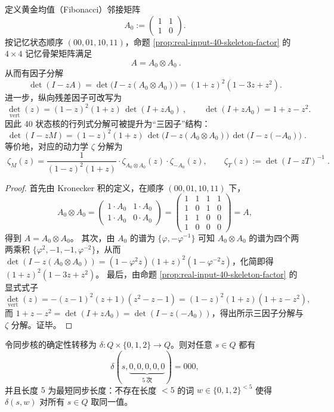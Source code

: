 \begin{proposition}\label{prop:real-input-40-A0-tensor-hidden}
定义黄金均值（Fibonacci）邻接矩阵
\[
A_0:=\begin{pmatrix}1&1\\[2pt]1&0\end{pmatrix}.
\]
按记忆状态顺序 \((00,01,10,11)\)，命题 \ref{prop:real-input-40-skeleton-factor} 的 \(4\times 4\) 记忆骨架矩阵满足
\[
\boxed{\ A=A_0\otimes A_0\ }.
\]
从而有因子分解
\[
\det(I-zA)=\det\!\bigl(I-z(A_0\otimes A_0)\bigr)
=(1+z)^2(1-3z+z^2).
\]
进一步，纵向残差因子可改写为
\[
\boxed{\ \det_{\mathrm{vert}}(z)=(1-z)^2(1+z)\,\det(I+zA_0)\ },
\qquad
\det(I+zA_0)=1+z-z^2.
\]
因此 40 状态核的行列式分解可被提升为“三因子”结构：
\[
\boxed{\;
\det(I-zM)
=(1-z)^2(1+z)\,
\det\!\bigl(I-z(A_0\otimes A_0)\bigr)\,
\det\!\bigl(I-z(-A_0)\bigr)\; }.
\]
等价地，对应的动力学 \(\zeta\) 分解为
\[
\boxed{\;
\zeta_M(z)=\frac{1}{(1-z)^2(1+z)}\cdot
\zeta_{A_0\otimes A_0}(z)\cdot
\zeta_{-A_0}(z),\qquad
\zeta_T(z):=\det(I-zT)^{-1}\; }.
\]
\end{proposition}

\begin{proof}
首先由 Kronecker 积的定义，在顺序 \((00,01,10,11)\) 下，
\[
A_0\otimes A_0=
\begin{pmatrix}
1\cdot A_0 & 1\cdot A_0\\
1\cdot A_0 & 0\cdot A_0
\end{pmatrix}
=
\begin{pmatrix}
1&1&1&1\\
1&0&1&0\\
1&1&0&0\\
1&0&0&0
\end{pmatrix}=A,
\]
得到 \(A=A_0\otimes A_0\)。
其次，由 \(A_0\) 的谱为 \(\{\varphi,-\varphi^{-1}\}\) 可知 \(A_0\otimes A_0\) 的谱为四个两两乘积
\(\{\varphi^2,-1,-1,\varphi^{-2}\}\)，从而
\(\det(I-z(A_0\otimes A_0))=(1-\varphi^2 z)(1+\!z)^2(1-\varphi^{-2}z)\)，化简即得 \((1+z)^2(1-3z+z^2)\)。
最后，由命题 \ref{prop:real-input-40-skeleton-factor} 的显式式子
\[
\det_{\mathrm{vert}}(z)=-(z-1)^2(z+1)(z^2-z-1)
=(1-z)^2(1+z)(1+z-z^2),
\]
而 \(1+z-z^2=\det(I+zA_0)=\det(I-z(-A_0))\)，得出所示三因子分解与 \(\zeta\) 分解。证毕。
\end{proof}



\begin{proposition}\label{prop:real-input-40-reset-word}
令同步核的确定性转移为 $\delta:Q\times\{0,1,2\}\to Q$。则对任意 $s\in Q$ 都有
\[
\delta(s,\underbrace{0,0,0,0,0}_{5\ \text{次}})=000,
\]
并且长度 $5$ 为最短同步长度：不存在长度 $<5$ 的词 $w\in\{0,1,2\}^{<5}$ 使得 $\delta(s,w)$ 对所有 $s\in Q$ 取同一值。
\end{proposition}

